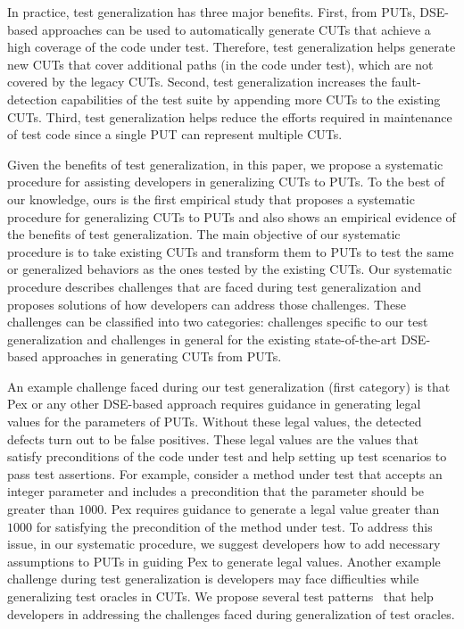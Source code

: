 In practice, test generalization has three major benefits. First, from PUTs, DSE-based approaches can be used to automatically generate CUTs that achieve a high coverage
of the code under test. Therefore, test generalization helps generate new CUTs that cover additional paths (in the code under test), which are not covered by the legacy CUTs. Second, test generalization increases the fault-detection capabilities of the test suite by appending more CUTs to the existing CUTs. Third, test generalization helps reduce the efforts required in maintenance of test code since a single PUT can represent multiple CUTs. 

Given the benefits of test generalization, in this paper, we propose a systematic procedure for assisting developers in generalizing CUTs to PUTs. To the best of our knowledge, ours is the first empirical study that proposes a systematic procedure for generalizing CUTs to PUTs and also shows an empirical evidence of the benefits of test generalization. The main objective of our systematic procedure is to take existing CUTs and transform them to PUTs to test the same or generalized behaviors as the ones tested by the existing CUTs. Our systematic procedure describes challenges that are faced during test generalization and proposes solutions of how developers can address those challenges. These challenges can be classified into two categories: challenges specific to our test generalization and challenges in general for the existing state-of-the-art DSE-based approaches in generating CUTs from PUTs. 

An example challenge faced during our test generalization (first category) is that Pex or any other DSE-based approach requires guidance in generating legal values for the parameters of PUTs. Without these legal values, the detected defects turn out to be false positives. These legal values are the values that satisfy preconditions of the code under test and help setting up test scenarios to pass test assertions. For example, consider a method under test that accepts an integer parameter and includes a precondition that the parameter should be greater than $1000$. Pex requires guidance to generate a legal value greater than $1000$ for satisfying the precondition of the method under test. To address this issue, in our systematic procedure, we suggest developers how to add necessary assumptions to PUTs in guiding Pex to generate legal values. Another example challenge during test generalization is developers may face difficulties while generalizing test oracles in CUTs. We propose several test patterns~\cite{halleux08:putpatterns} that help developers in addressing the challenges faced during generalization of test oracles.

